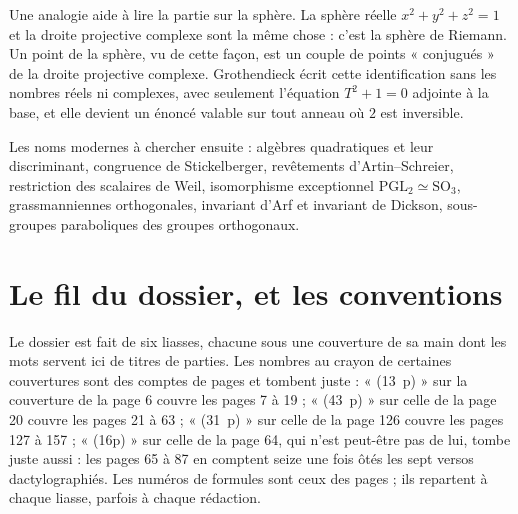 \documentclass[11pt,a4paper]{article}
\begin{document}
\begin{resume}
Une analogie aide à lire la partie sur la sphère. La sphère réelle
$x^2 + y^2 + z^2 = 1$ et la droite projective complexe sont la même chose :
c'est la sphère de Riemann. Un point de la sphère, vu de cette façon, est un
couple de points « conjugués » de la droite projective complexe. Grothendieck
écrit cette identification sans les nombres réels ni complexes, avec
seulement l'équation $T^2 + 1 = 0$ adjointe à la base, et elle devient un
énoncé valable sur tout anneau où $2$ est inversible.

Les noms modernes à chercher ensuite : algèbres quadratiques et leur
discriminant, congruence de Stickelberger, revêtements d'Artin--Schreier,
restriction des scalaires de Weil, isomorphisme exceptionnel
$\mathrm{PGL}_2 \simeq \mathrm{SO}_3$, grassmanniennes orthogonales, invariant
d'Arf et invariant de Dickson, sous-groupes paraboliques des groupes
orthogonaux.

\end{resume}

\section*{Le fil du dossier, et les conventions}

Le dossier est fait de six liasses, chacune sous une couverture de sa main
dont les mots servent ici de titres de parties. Les nombres au crayon de
certaines couvertures sont des comptes de pages et tombent juste :
« (13~p) » sur la couverture de la page 6 couvre les pages 7 à 19 ;
« (43~p) » sur celle de la page 20 couvre les pages 21 à 63 ; « (31~p) » sur
celle de la page 126 couvre les pages 127 à 157 ; « (16p) » sur celle de la
page 64, qui n'est peut-être pas de lui, tombe juste aussi : les pages 65 à 87
en comptent seize une fois ôtés les sept versos dactylographiés. Les numéros de formules
sont ceux des pages ; ils repartent à chaque liasse, parfois à chaque
rédaction.
\end{document}
